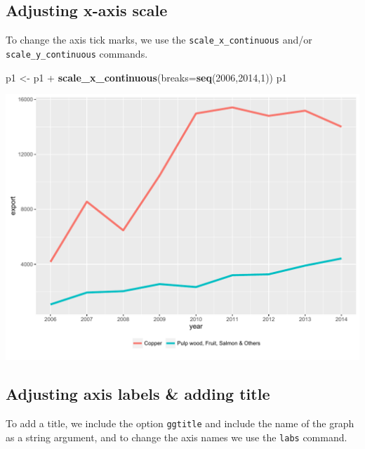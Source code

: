 \documentclass[]{article}
\newenvironment{Shaded}{\begin{snugshade}}{\end{snugshade}}
\newcommand{\KeywordTok}[1]{\textcolor[rgb]{0.13,0.29,0.53}{\textbf{{#1}}}}
\newcommand{\DataTypeTok}[1]{\textcolor[rgb]{0.13,0.29,0.53}{{#1}}}
\newcommand{\DecValTok}[1]{\textcolor[rgb]{0.00,0.00,0.81}{{#1}}}
\newcommand{\StringTok}[1]{\textcolor[rgb]{0.31,0.60,0.02}{{#1}}}
\newcommand{\NormalTok}[1]{{#1}}
\begin{document}
\subsection{Adjusting x-axis scale}\label{adjusting-x-axis-scale}

To change the axis tick marks, we use the \texttt{scale\_x\_continuous}
and/or \texttt{scale\_y\_continuous} commands.

\begin{Shaded}
\begin{Highlighting}[]
\NormalTok{p1 <-}\StringTok{ }\NormalTok{p1 +}\StringTok{ }\KeywordTok{scale_x_continuous}\NormalTok{(}\DataTypeTok{breaks=}\KeywordTok{seq}\NormalTok{(}\DecValTok{2006}\NormalTok{,}\DecValTok{2014}\NormalTok{,}\DecValTok{1}\NormalTok{))}
\NormalTok{p1}
\end{Highlighting}
\end{Shaded}

\begin{center}\includegraphics{0_all_posts_pdf/line_4-1} \end{center}

\subsection{Adjusting axis labels \& adding
title}\label{adjusting-axis-labels-adding-title}

To add a title, we include the option \texttt{ggtitle} and include the
name of the graph as a string argument, and to change the axis names we
use the \texttt{labs} command.

\begin{Shaded}
\end{Shaded}
\end{document}

